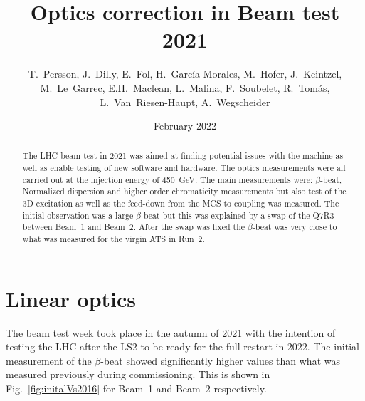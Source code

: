 \documentclass[a4paper]{cernatsnote}
\title{Optics correction in Beam test 2021}
\author{ T.~Persson, J.~Dilly, E.~Fol, H.~Garc\'ia Morales, M.~Hofer,
 J.~Keintzel, M.~Le~Garrec, E.H.~Maclean, L.~Malina,  F.~Soubelet, R.~Tom\'as, L.~Van~Riesen-Haupt,  A.~Wegscheider}
\date{February 2022}
\begin{document}
\maketitle
\begin{abstract}
The LHC beam test in 2021 was aimed at finding potential issues with the machine as well as enable testing of new software and hardware. The optics measurements were all carried out at the injection energy of 450~GeV. The main measurements were: $\beta$-beat, Normalized dispersion and higher order chromaticity measurements but also test of the 3D excitation as well as the feed-down from the MCS to coupling was measured. The initial observation was a large $\beta$-beat but this was explained by a swap of the Q7R3 between Beam~1 and Beam~2. After the swap was fixed the $\beta$-beat was very close to what was measured for the virgin ATS in Run~2. 
\end{abstract}
\section{Linear optics}
The beam test week took place in the autumn of 2021 with the intention of testing the LHC after the LS2 to be ready for the full restart in 2022.
The initial measurement of the $\beta$-beat showed significantly higher values than what was measured previously during commissioning. This is shown in Fig.~\ref{fig:initalVs2016} for Beam~1 and Beam~2 respectively.  
\end{document}
